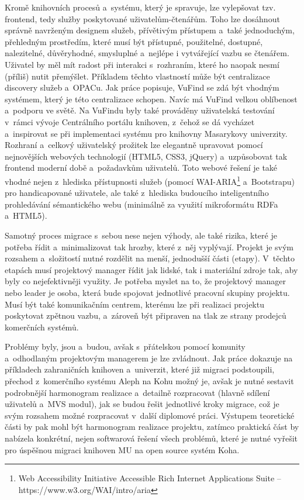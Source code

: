 \documentclass[
	11pt, oneside, printed, final, palatino
	microtype,
	table,   %
	lof,     %
	lot     %
]{fithesis3}
\begin{document}
{Kromě knihovních procesů a~systému, který je spravuje, lze vylepšovat tzv. frontend, tedy služby poskytované uživatelům-čtenářům. Toho lze dosáhnout správně navrženým designem služeb, přívětivým přístupem a~také jednoduchým, přehledným prostředím, které musí být přístupné, použitelné, dostupné, nalezitelné, důvěryhodné, smysluplné a~nejlépe i vytvářející vazbu se čtenářem. Uživatel by měl mít radost při interakci s~rozhraním, které ho naopak nesmí (příliš) nutit přemýšlet. Příkladem těchto vlastností může být centralizace discovery služeb a~OPACu. Jak práce popisuje, VuFind se zdá být vhodným systémem, který je této centralizace schopen. Navíc má VuFind velkou oblíbenost a~podporu ve světě. Na VuFindu byly také prováděny uživatelská testování v~rámci vývoje Centrálního portálu knihoven, z~čehož se dá vycházet a~inspirovat se při implementaci systému pro knihovny Masarykovy univerzity. Rozhraní a~celkový uživatelský prožitek lze elegantně upravovat pomocí nejnovějších webových technologií (HTML5, CSS3, jQuery) a~uzpůsobovat tak frontend moderní době a~požadavkům uživatelů. Toto webové řešení je také vhodné nejen z~hlediska  přístupnosti služeb (pomocí WAI-ARIA\footnote{Web Accessibility Initiative Accessible Rich Internet Applications Suite –  https://www.w3.org/WAI/intro/aria
} a~Bootstrapu) pro handicapované uživatele, ale také z~hlediska budoucího inteligentního prohledávání sémantického webu (minimálně za využití mikroformátu RDFa a~HTML5).  
 
 Samotný proces migrace s~sebou nese nejen výhody, ale také rizika, které je potřeba řídit a~minimalizovat tak hrozby, které z~něj vyplývají. Projekt je svým rozsahem a~složitostí nutné rozdělit na menší, jednodušší části (etapy). V~těchto etapách musí projektový manager řídit jak lidské, tak i materiální zdroje tak, aby byly co nejefektivněji využity. Je potřeba myslet na to, že projektový manager nebo leader je osoba, která bude spojovat jednotlivé pracovní skupiny projektu. Musí být také komunikačním centrem, kterému lze při realizaci projektu poskytovat zpětnou vazbu, a~zároveň být připraven na tlak ze strany prodejců komerčních systémů. 
 
  Problémy byly, jsou a~budou, avšak s~přátelskou pomocí komunity a~odhodlaným projektovým managerem je lze zvládnout. Jak práce dokazuje na příkladech zahraničních knihoven a~univerzit, které již migraci podstoupili, přechod z~komerčního systému Aleph na Kohu možný je, avšak je nutné sestavit podrobnější harmonogram realizace a~detailně rozpracovat (hlavně sdílení uživatelů a~MVS modul), jak se budou řešit jednotlivé kroky migrace, což je svým rozsahem možné rozpracovat v~další diplomové práci. Výstupem teoretické části by pak mohl být harmonogram realizace projektu, zatímco praktická část by nabízela konkrétní, nejen softwarová řešení všech problémů, které je nutné vyřešit pro úspěšnou migraci knihoven MU na open source systém Koha.

}
\end{document}
